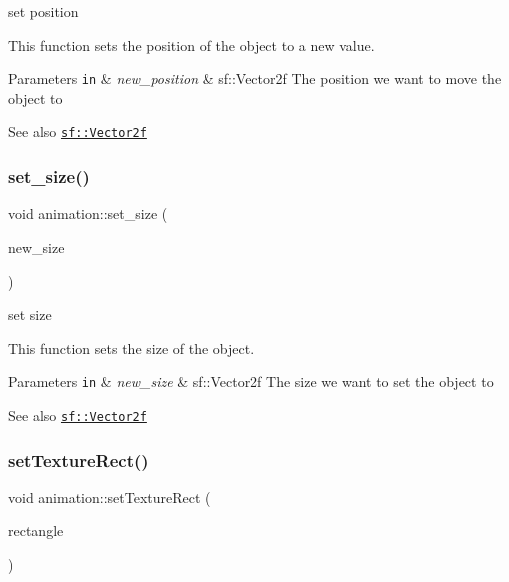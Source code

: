 set position 

This function sets the position of the object to a new value.


\begin{DoxyParams}[1]{Parameters}
\mbox{\tt in}  & {\em new\+\_\+position} & sf\+::\+Vector2f The position we want to move the object to \\
\hline
\end{DoxyParams}
\begin{DoxySeeAlso}{See also}
\href{https://www.sfml-dev.org/documentation/2.0/classsf_1_1Vector2.php }{\tt sf\+::\+Vector2f} 
\end{DoxySeeAlso}
\mbox{\label{classanimation_a7c0b874294e81f3612590920fd845602}} 
\subsubsection{\texorpdfstring{set\+\_\+size()}{set\_size()}}
{\footnotesize\ttfamily void animation\+::set\+\_\+size (\begin{DoxyParamCaption}\item[{sf\+::\+Vector2f}]{new\+\_\+size }\end{DoxyParamCaption})}



set size 

This function sets the size of the object.


\begin{DoxyParams}[1]{Parameters}
\mbox{\tt in}  & {\em new\+\_\+size} & sf\+::\+Vector2f The size we want to set the object to \\
\hline
\end{DoxyParams}
\begin{DoxySeeAlso}{See also}
\href{https://www.sfml-dev.org/documentation/2.0/classsf_1_1Vector2.php }{\tt sf\+::\+Vector2f} 
\end{DoxySeeAlso}
\mbox{\label{classanimation_a30e84ff71206b8ec4f82fd70ad776036}} 
\subsubsection{\texorpdfstring{set\+Texture\+Rect()}{setTextureRect()}}
{\footnotesize\ttfamily void animation\+::set\+Texture\+Rect (\begin{DoxyParamCaption}\item[{const sf\+::\+Int\+Rect \&}]{rectangle }\end{DoxyParamCaption})}



